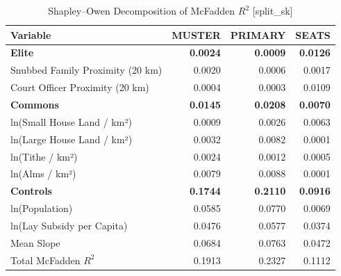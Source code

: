 \begin{table}[H]
\centering
\caption{Shapley--Owen Decomposition of McFadden $R^2$ [split_sk]}
\label{tab:shapley_owen_split_sk}
\begin{tabular}{lrrr}
\hline\hline
Variable & MUSTER & PRIMARY & SEATS \\
\hline
\textbf{Elite} & \textbf{0.0024} & \textbf{0.0009} & \textbf{0.0126} \\
\quad Snubbed Family Proximity (20 km) & 0.0020 & 0.0006 & 0.0017 \\
\quad Court Officer Proximity (20 km) & 0.0004 & 0.0003 & 0.0109 \\
\textbf{Commons} & \textbf{0.0145} & \textbf{0.0208} & \textbf{0.0070} \\
\quad ln(Small House Land / km²) & 0.0009 & 0.0026 & 0.0063 \\
\quad ln(Large House Land / km²) & 0.0032 & 0.0082 & 0.0001 \\
\quad ln(Tithe / km²) & 0.0024 & 0.0012 & 0.0005 \\
\quad ln(Alms / km²) & 0.0079 & 0.0088 & 0.0001 \\
\textbf{Controls} & \textbf{0.1744} & \textbf{0.2110} & \textbf{0.0916} \\
\quad ln(Population) & 0.0585 & 0.0770 & 0.0069 \\
\quad ln(Lay Subsidy per Capita) & 0.0476 & 0.0577 & 0.0374 \\
\quad Mean Slope & 0.0684 & 0.0763 & 0.0472 \\
\hline
Total McFadden $R^2$ & 0.1913 & 0.2327 & 0.1112 \\
\hline\hline
\end{tabular}
\end{table}
